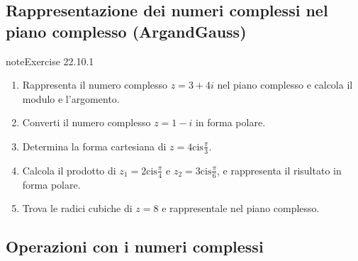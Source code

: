 \documentclass[letterpaper,10pt,italian]{jupyterBook}
\begin{document}
\subsection{Rappresentazione dei numeri complessi nel piano complesso (Argand\sphinxhyphen{}Gauss)}
\label{\detokenize{ch/algebra/complex-algebra-problems:rappresentazione-dei-numeri-complessi-nel-piano-complesso-argand-gauss}}\label{\detokenize{ch/algebra/complex-algebra-problems:math-hs-algebra-complex-problems-complex-plane}} \label{exercise:ch/algebra/complex-algebra-problems-exercise-0}

\begin{sphinxadmonition}{note}{Exercise 22.10.1}


\begin{enumerate}
%
\item {} 
\sphinxAtStartPar
Rappresenta il numero complesso \( z = 3 + 4i \) nel piano complesso e calcola il modulo e l’argomento.

\item {} 
\sphinxAtStartPar
Converti il numero complesso \( z = 1 - i \) in forma polare.

\item {} 
\sphinxAtStartPar
Determina la forma cartesiana di \( z = 4 \text{cis}\frac{\pi}{3} \).

\item {} 
\sphinxAtStartPar
Calcola il prodotto di \( z_1 = 2 \text{cis}\frac{\pi}{4} \) e \( z_2 = 3 \text{cis}\frac{\pi}{6} \), e rappresenta il risultato in forma polare.

\item {} 
\sphinxAtStartPar
Trova le radici cubiche di \( z = 8 \) e rappresentale nel piano complesso.

\end{enumerate}
\end{sphinxadmonition}




\subsection{Operazioni con i numeri complessi}
\label{\detokenize{ch/algebra/complex-algebra-problems:operazioni-con-i-numeri-complessi}}\label{\detokenize{ch/algebra/complex-algebra-problems:math-hs-algebra-complex-problems-operations}} \label{exercise:ch/algebra/complex-algebra-problems-exercise-1}
\end{document}
